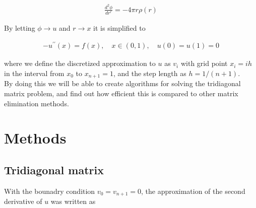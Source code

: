 \documentclass[12pt]{article}
\begin{document}
\begin{align*}
    \frac{d^2\phi}{dr^r} = -4 \pi r \rho(r)
\end{align*}

\noindent By letting $\phi \rightarrow u$ and $r \rightarrow x$ it is simplified to

\begin{align*}
    -u^{\prime \prime}(x) = f(x), \quad x \in (0,1), \quad  u(0) = u(1) = 0
\end{align*}

\noindent where we define the discretized approximation to $u$ as $v_i$ with grid point $x_i = ih$ in the interval from $x_0$ to $x_{n+1} = 1$, and the step length as $h = 1/(n+1)$. \\

\noindent By doing this we will be able to create algorithms for solving the tridiagonal matrix problem, and find out how efficient this is compared to other matrix elimination methods.

\newpage

\section{Methods}


\subsection{Tridiagonal matrix}

\noindent With the bounadry condition $v_0 = v_{n+1} = 0$, the approximation of the second derivative of $u$ was written as
\end{document}
